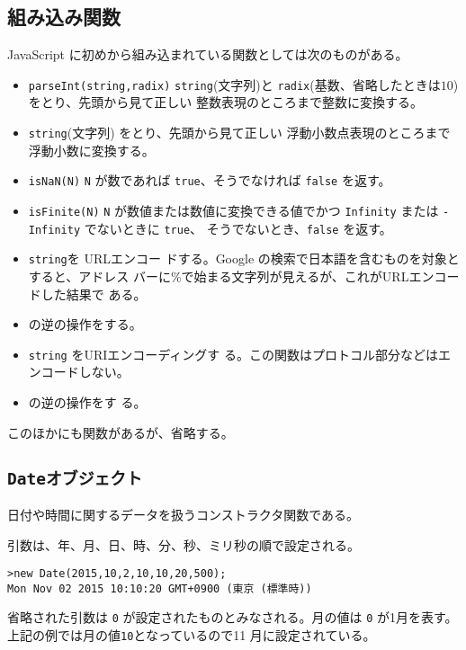 \subsection{組み込み関数}
JavaScript に初めから組み込まれている関数としては次のものがある。
\begin{itemize}
 \item \Verb+parseInt(string,radix)+ \Verb+string+(文字列)と
       \Verb+radix+(基数、省略したときは$10$)をとり、先頭から見て正しい
       整数表現のところまで整数に変換する。
 \item {} \Verb+string+(文字列)
       をとり、先頭から見て正しい
       浮動小数点表現のところまで浮動小数に変換する。
 \item \Verb+isNaN(N)+ \Verb+N+ が数であれば \Verb+true+、そうでなければ
       \Verb+false+ を返す。
 \item \Verb+isFinite(N)+ \Verb+N+ が数値または数値に変換できる値でかつ
       \Verb+Infinity+ または \Verb+-Infinity+ でないときに \Verb+true+、
       そうでないとき、\Verb+false+ を返す。
 \item {} \texttt{string}を URLエンコー
			 ドする。Google の検索で日本語を含むものを対象とすると、アドレス
			 バーに\%で始まる文字列が見えるが、これがURLエンコードした結果で
			 ある。 
 \item {}
			 の逆の操作をする。
 \item {} \texttt{string} をURIエンコーディングす
			 る。この関数はプロトコル部分などはエンコードしない。
 \item {}  の逆の操作をす
			 る。
\end{itemize}
このほかにも関数があるが、省略する。
\subsection{\protect\texttt{Dateオブジェクト}}
日付や時間に関するデータを扱うコンストラクタ関数である。

引数は、年、月、日、時、分、秒、ミリ秒の順で設定される。
\begin{Verbatim}
>new Date(2015,10,2,10,10,20,500);
Mon Nov 02 2015 10:10:20 GMT+0900 (東京 (標準時))
\end{Verbatim}
省略された引数は \texttt{0} が設定されたものとみなされる。月の値は
\texttt{0} が1月を表す。上記の例では月の値\texttt{10}となっているので11
月に設定されている。

